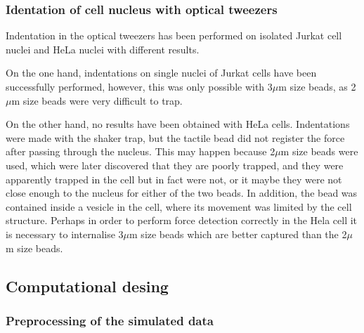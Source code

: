 \documentclass[12pt, a4paper]{article} %
\begin{document}
\setlength{\parskip}{0mm}

\subsubsection{Identation of cell nucleus with optical tweezers}

Indentation in the optical tweezers has been performed on isolated Jurkat cell nuclei and HeLa nuclei with different results.

\setlength{\parskip}{4mm}

On the one hand, indentations on single nuclei of Jurkat cells have been successfully performed, however, this was only possible with 3$\mu$m size beads, as 2$\mu$m size beads were very difficult to trap. 

On the other hand, no results have been obtained with HeLa cells. Indentations were made with the shaker trap, but the tactile bead did not register the force after passing through the nucleus. This may happen because 2$\mu$m size beads were used, which were later discovered that they are poorly trapped, and they were apparently trapped in the cell but in fact were not, or it maybe they were not close enough to the nucleus for either of the two beads. In addition, the bead was contained inside a vesicle in the cell, where its movement was limited by the cell structure. Perhaps in order to perform force detection correctly in the Hela cell it is necessary to internalise 3$\mu$m size beads which are better captured than the 2$\mu$m size beads.

\setlength{\parskip}{0mm}

\subsection{Computational desing}

\subsubsection{Preprocessing of the simulated data}
\end{document}
